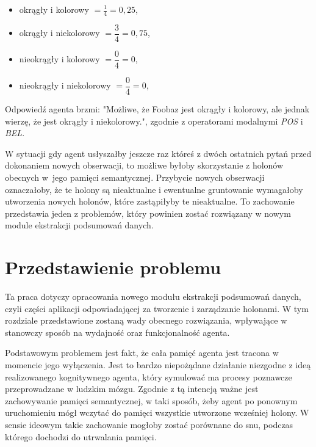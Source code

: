 \begin{itemize}
	\setlength{\itemindent}{.5in}
	\item okrągły i kolorowy $ = \frac{1}{4} = 0,25 $,
	\vspace{0.1in}
	\item okrągły i niekolorowy $ = \dfrac{3}{4} = 0,75 $,
	\vspace{0.1in}
	\item nieokrągły i kolorowy $ = \dfrac{0}{4} = 0 $,
	\vspace{0.1in}
	\item nieokrągły i niekolorowy $ = \dfrac{0}{4} = 0 $,
\end{itemize}  

Odpowiedź agenta brzmi: "Możliwe, że Foobaz jest okrągły i kolorowy, ale jednak wierzę, że jest okrągły i niekolorowy.", zgodnie z operatorami modalnymi \textit{POS} i \textit{BEL}.

W sytuacji gdy agent usłyszałby jeszcze raz któreś z dwóch ostatnich pytań przed dokonaniem nowych obserwacji, to możliwe byłoby skorzystanie z holonów obecnych w~jego pamięci semantycznej. Przybycie nowych obserwacji oznaczałoby, że te holony są nieaktualne i ewentualne gruntowanie wymagałoby utworzenia nowych holonów, które zastąpiłyby te nieaktualne. To zachowanie przedstawia jeden z problemów, który powinien zostać rozwiązany w nowym module ekstrakcji podsumowań danych.


\section{Przedstawienie problemu}

Ta praca dotyczy opracowania nowego modułu ekstrakcji podsumowań danych, czyli części aplikacji odpowiadającej za tworzenie i zarządzanie holonami. W tym rozdziale przedstawione zostaną wady obecnego rozwiązania, wpływające w stanowczy sposób na wydajność oraz funkcjonalność agenta.

Podstawowym problemem jest fakt, że cała pamięć agenta jest tracona w momencie jego wyłączenia. Jest to bardzo niepożądane działanie niezgodne z ideą realizowanego kognitywnego agenta, który symulować ma procesy poznawcze przeprowadzane w ludzkim mózgu. Zgodnie z tą intencją ważne jest zachowywanie pamięci semantycznej, w taki sposób, żeby agent po ponownym uruchomieniu mógł wczytać do pamięci wszystkie utworzone wcześniej holony. W sensie ideowym takie zachowanie mogłoby zostać porównane do snu, podczas którego dochodzi do utrwalania pamięci.

